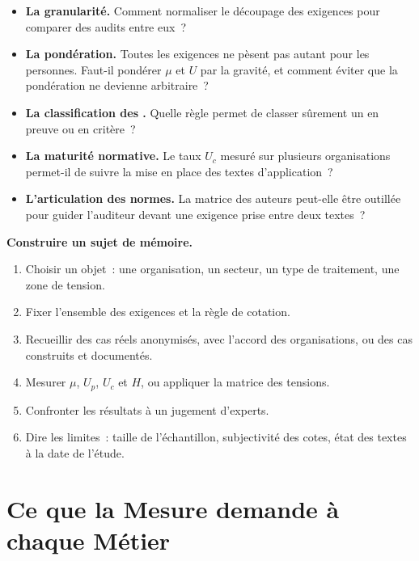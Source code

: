 \begin{itemize}
    \item \textbf{La granularité.} Comment normaliser le découpage des
          exigences pour comparer des audits entre eux~?
    \item \textbf{La pondération.} Toutes les exigences ne pèsent pas
          autant pour les personnes. Faut-il pondérer $\mu$ et $U$ par la
          gravité, et comment éviter que la pondération ne devienne
          arbitraire~?
    \item \textbf{La classification des \NEK{}.} Quelle règle permet de
          classer sûrement un \NEK{} en preuve ou en critère~?
    \item \textbf{La maturité normative.} Le taux $U_c$ mesuré sur plusieurs
          organisations permet-il de suivre la mise en place des textes
          d'application~?
    \item \textbf{L'articulation des normes.} La matrice des auteurs
          peut-elle être outillée pour guider l'auditeur devant une exigence
          prise entre deux textes~?
\end{itemize}

\begin{boxinfo}
\textbf{Construire un sujet de mémoire.}
\begin{enumerate}
    \item Choisir un objet~: une organisation, un secteur, un type de
          traitement, une zone de tension.
    \item Fixer l'ensemble des exigences et la règle de cotation.
    \item Recueillir des cas réels anonymisés, avec l'accord des
          organisations, ou des cas construits et documentés.
    \item Mesurer $\mu$, $U_p$, $U_c$ et $H$, ou appliquer la matrice des
          tensions.
    \item Confronter les résultats à un jugement d'experts.
    \item Dire les limites~: taille de l'échantillon, subjectivité des
          cotes, état des textes à la date de l'étude.
\end{enumerate}
\end{boxinfo}

\section{Ce que la Mesure demande à chaque Métier}
\label{sec:c16-metiers}

